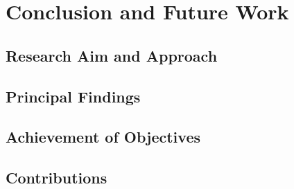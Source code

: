 \chapter{Conclusion and Future Work}
\label{chap:conclusion}


\section{Research Aim and Approach}
\label{sec:conclusion-aim}


\section{Principal Findings}
\label{sec:principal-findings}


\section{Achievement of Objectives}
\label{sec:objective-achievement-conclusion}


\section{Contributions}
\label{sec:contributions}

